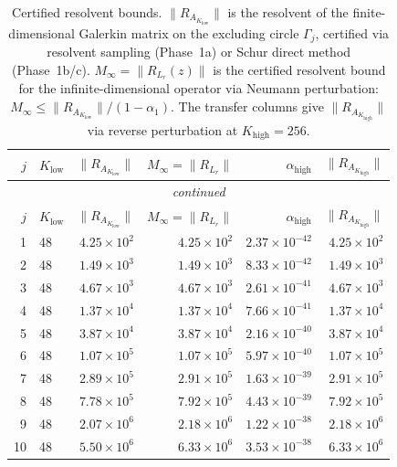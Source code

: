 \documentclass[11pt]{article}
\begin{document}
\begin{longtable}{rlrrrr}
\caption{Certified resolvent bounds.  $\|R_{A_{K_{\mathrm{low}}}}\|$ is the resolvent of the
finite-dimensional Galerkin matrix on the excluding circle $\Gamma_j$, certified via
resolvent sampling (Phase~1a) or Schur direct method (Phase~1b/c).
$M_\infty = \|R_{L_r}(z)\|$ is the certified resolvent bound
for the infinite-dimensional operator via Neumann perturbation:
$M_\infty \leq \|R_{A_{K_{\mathrm{low}}}}\| / (1 - \alpha_1)$.
The transfer columns give $\|R_{A_{K_{\mathrm{high}}}}\|$ via reverse perturbation
at $K_{\mathrm{high}} = 256$.}
\label{tab:resolvent-bounds}\\
\toprule
$j$ & $K_{\mathrm{low}}$ & $\|R_{A_{K_{\mathrm{low}}}}\|$ & $M_\infty = \|R_{L_r}\|$ & $\alpha_{\mathrm{high}}$ & $\|R_{A_{K_{\mathrm{high}}}}\|$ \\
\midrule
\endfirsthead
\multicolumn{6}{c}{\textit{continued}} \\
\toprule
$j$ & $K_{\mathrm{low}}$ & $\|R_{A_{K_{\mathrm{low}}}}\|$ & $M_\infty = \|R_{L_r}\|$ & $\alpha_{\mathrm{high}}$ & $\|R_{A_{K_{\mathrm{high}}}}\|$ \\
\midrule
\endhead
1 & 48 & $4.25 \times 10^{2}$ & $4.25 \times 10^{2}$ & $2.37 \times 10^{-42}$ & $4.25 \times 10^{2}$ \\
2 & 48 & $1.49 \times 10^{3}$ & $1.49 \times 10^{3}$ & $8.33 \times 10^{-42}$ & $1.49 \times 10^{3}$ \\
3 & 48 & $4.67 \times 10^{3}$ & $4.67 \times 10^{3}$ & $2.61 \times 10^{-41}$ & $4.67 \times 10^{3}$ \\
4 & 48 & $1.37 \times 10^{4}$ & $1.37 \times 10^{4}$ & $7.66 \times 10^{-41}$ & $1.37 \times 10^{4}$ \\
5 & 48 & $3.87 \times 10^{4}$ & $3.87 \times 10^{4}$ & $2.16 \times 10^{-40}$ & $3.87 \times 10^{4}$ \\
6 & 48 & $1.07 \times 10^{5}$ & $1.07 \times 10^{5}$ & $5.97 \times 10^{-40}$ & $1.07 \times 10^{5}$ \\
7 & 48 & $2.89 \times 10^{5}$ & $2.91 \times 10^{5}$ & $1.63 \times 10^{-39}$ & $2.91 \times 10^{5}$ \\
8 & 48 & $7.78 \times 10^{5}$ & $7.92 \times 10^{5}$ & $4.43 \times 10^{-39}$ & $7.92 \times 10^{5}$ \\
9 & 48 & $2.07 \times 10^{6}$ & $2.18 \times 10^{6}$ & $1.22 \times 10^{-38}$ & $2.18 \times 10^{6}$ \\
10 & 48 & $5.50 \times 10^{6}$ & $6.33 \times 10^{6}$ & $3.53 \times 10^{-38}$ & $6.33 \times 10^{6}$ \\

\end{longtable}
\end{document}
